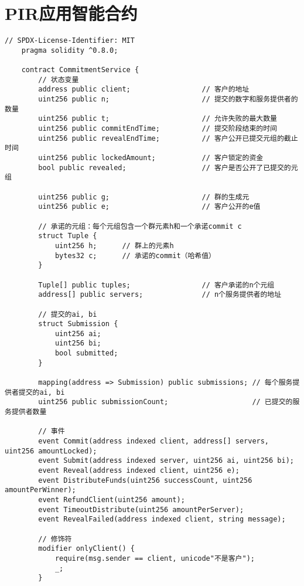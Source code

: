 \section{PIR应用智能合约}
\label{appendix:contract}
\begin{lstlisting}[language=Solidity]
    // SPDX-License-Identifier: MIT
    pragma solidity ^0.8.0;
    
    contract CommitmentService {
        // 状态变量
        address public client;                 // 客户的地址
        uint256 public n;                      // 提交的数字和服务提供者的数量
        uint256 public t;                      // 允许失败的最大数量
        uint256 public commitEndTime;          // 提交阶段结束的时间
        uint256 public revealEndTime;          // 客户公开已提交元组的截止时间
        uint256 public lockedAmount;           // 客户锁定的资金
        bool public revealed;                  // 客户是否公开了已提交的元组
    
        uint256 public g;                      // 群的生成元
        uint256 public e;                      // 客户公开的e值
    
        // 承诺的元组：每个元组包含一个群元素h和一个承诺commit c
        struct Tuple {
            uint256 h;      // 群上的元素h
            bytes32 c;      // 承诺的commit（哈希值）
        }
    
        Tuple[] public tuples;                 // 客户承诺的n个元组
        address[] public servers;              // n个服务提供者的地址
    
        // 提交的ai, bi
        struct Submission {
            uint256 ai;
            uint256 bi;
            bool submitted;
        }
    
        mapping(address => Submission) public submissions; // 每个服务提供者提交的ai, bi
        uint256 public submissionCount;                    // 已提交的服务提供者数量
    
        // 事件
        event Commit(address indexed client, address[] servers, uint256 amountLocked);
        event Submit(address indexed server, uint256 ai, uint256 bi);
        event Reveal(address indexed client, uint256 e);
        event DistributeFunds(uint256 successCount, uint256 amountPerWinner);
        event RefundClient(uint256 amount);
        event TimeoutDistribute(uint256 amountPerServer);
        event RevealFailed(address indexed client, string message);
    
        // 修饰符
        modifier onlyClient() {
            require(msg.sender == client, unicode"不是客户");
            _;
        }
    

\end{lstlisting}
